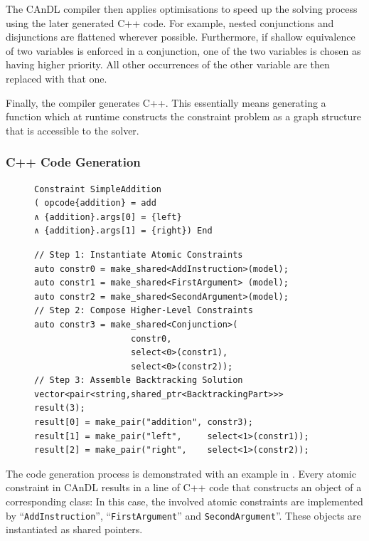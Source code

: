     The CAnDL compiler then applies optimisations to speed up the solving
    process using the later generated C++ code.
    For example, nested conjunctions and disjunctions are flattened wherever
    possible.
    Furthermore, if shallow equivalence of two variables is enforced in a
    conjunction, one of the two variables is chosen as having higher priority.
    All other occurrences of the other variable are then replaced with that
    one.

    Finally, the compiler generates C++.
    This essentially means generating a function which at runtime constructs
    the constraint problem as a graph structure that is accessible to the
    solver.

\subsubsection{C++ Code Generation}

\begin{figure}[t]
\centering
\begin{lstlisting}[language=CAnDL]
Constraint SimpleAddition
( opcode{addition} = add
∧ {addition}.args[0] = {left}
∧ {addition}.args[1] = {right}) End
\end{lstlisting}
\begin{lstlisting}[language=MyCpp,label={fig:codegen},caption=
   {C++ code generation: The code is generated to first instantiate atomic
    constraints, then compose higher-level constructs, and finally assemble a
    backtracking solution for solving.}]
// Step 1: Instantiate Atomic Constraints
auto constr0 = make_shared<AddInstruction>(model);
auto constr1 = make_shared<FirstArgument> (model);
auto constr2 = make_shared<SecondArgument>(model);
// Step 2: Compose Higher-Level Constraints
auto constr3 = make_shared<Conjunction>(
                   constr0,
                   select<0>(constr1),
                   select<0>(constr2));
// Step 3: Assemble Backtracking Solution
vector<pair<string,shared_ptr<BacktrackingPart>>> result(3);
result[0] = make_pair("addition", constr3);
result[1] = make_pair("left",     select<1>(constr1));
result[2] = make_pair("right",    select<1>(constr2));
\end{lstlisting}
\end{figure}

    The code generation process is demonstrated with an example in
    .
    Every atomic constraint in CAnDL results in a line of C++ code that
    constructs an object of a corresponding class:
    In this case, the involved atomic constraints are implemented by
    ``\texttt{AddInstruction}'', ``\texttt{FirstArgument}'' and
    \texttt{SecondArgument}''.
    These objects are instantiated as shared pointers.

